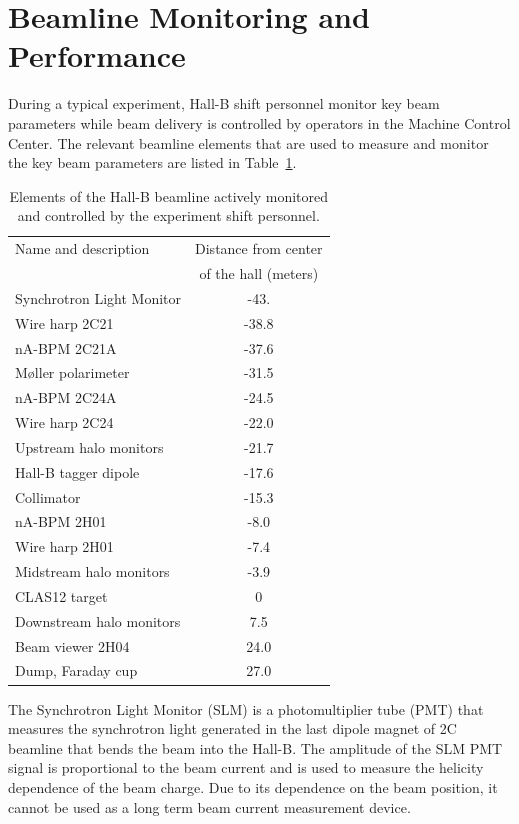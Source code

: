 \section{Beamline Monitoring and Performance}
\label{performance}

During a typical experiment, Hall-B shift personnel monitor key beam parameters while beam delivery is controlled by operators in the 
Machine Control Center. The relevant beamline elements that are used to measure and monitor the key beam parameters are listed 
in Table~\ref{tab:elements}. 


\begin{table}[htp]
\caption{Elements of the Hall-B beamline actively monitored and controlled by the experiment shift personnel.}
\begin{center}
\begin{tabular}{|l|c|}
\hline
Name and description & Distance from center \\
&of the hall (meters) \\  \hline
Synchrotron Light Monitor& -43. \\ 
Wire harp 2C21 & -38.8 \\
nA-BPM 2C21A & -37.6  \\
M{\o}ller polarimeter & -31.5  \\
nA-BPM 2C24A & -24.5  \\
Wire harp 2C24 & -22.0  \\
Upstream halo monitors&-21.7 \\
Hall-B tagger dipole & -17.6  \\ \hline
Collimator & -15.3 \\
nA-BPM 2H01 & -8.0  \\ %
Wire harp 2H01 & -7.4 \\
Midstream halo monitors& -3.9 \\ 
CLAS12 target & 0  \\ \hline
Downstream halo monitors & 7.5 \\
Beam viewer 2H04 & 24.0  \\
Dump, Faraday cup & 27.0  \\
\hline
\end{tabular}
\end{center}
\label{tab:elements}
\end{table}%

The Synchrotron Light Monitor (SLM) is a photomultiplier tube (PMT) that measures the synchrotron light 
generated in the last dipole magnet of 2C beamline that bends the beam into the Hall-B.  The amplitude of the SLM PMT signal is 
proportional to the beam current and is used to measure the helicity dependence of the beam charge. Due to its dependence on 
the beam position, it cannot be used as a long term beam current measurement device.


